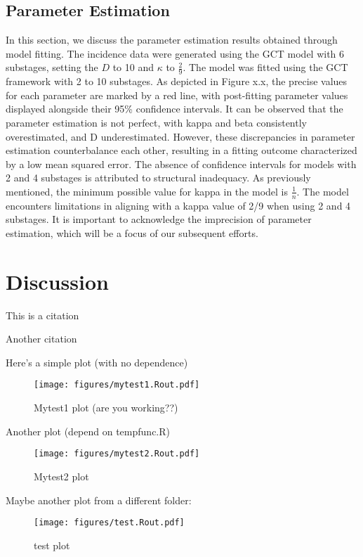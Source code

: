\documentclass[12pt]{article}
\begin{document}
\subsection{Parameter Estimation}
In this section, we discuss the parameter estimation results obtained through model fitting. The incidence data were generated using the GCT model with 6 substages, setting the $D$ to 10 and $\kappa$ to $\frac{2}{9}$. The model was fitted using the GCT framework with 2 to 10 substages. As depicted in Figure x.x, the precise values for each parameter are marked by a red line, with post-fitting parameter values displayed alongside their 95\% confidence intervals. It can be observed that the parameter estimation is not perfect, with kappa and beta consistently overestimated, and D underestimated. However, these discrepancies in parameter estimation counterbalance each other, resulting in a fitting outcome characterized by a low mean squared error. The absence of confidence intervals for models with 2 and 4 substages is attributed to structural inadequacy. As previously mentioned, the minimum possible value for kappa in the model is $\frac{1}{n}$. The model encounters limitations in aligning with a kappa value of 2/9 when using 2 and 4 substages. It is important to acknowledge the imprecision of parameter estimation, which will be a focus of our subsequent efforts.


\section{Discussion}






This is a citation \cite{Feng2016}

Another citation \cite{Anderson1991} 

Here's a simple plot (with no dependence)

\begin{figure}[h!]
    \centering
    \texttt{[image: figures/mytest1.Rout.pdf]}
    \caption{Mytest1 plot (are you working??)}
\end{figure}


Another plot (depend on tempfunc.R)

\begin{figure}[h]
    \centering
    \texttt{[image: figures/mytest2.Rout.pdf]}
    \caption{Mytest2 plot}
\end{figure}

Maybe another plot from a different folder:

\begin{figure}[h]
    \centering
    \texttt{[image: figures/test.Rout.pdf]}
    \caption{test plot}
\end{figure}






 
\end{document}
